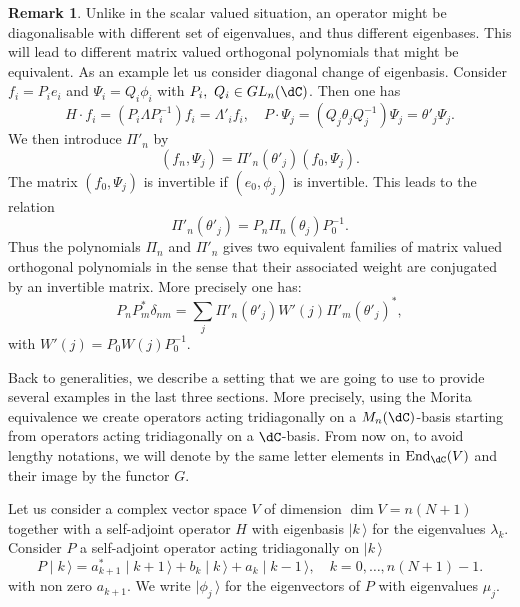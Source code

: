 \documentclass[a4paper,reqno]{amsart}
\DeclareMathOperator\End{ End}
\theoremstyle{definition}
\newtheorem{remark}[theorem]{Remark}
\numberwithin{equation}{section}
\newcommand{\ket}[1]{\mid{#1}\,\rangle}
\begin{document}
\begin{remark}
Unlike in the scalar valued situation, an operator might be diagonalisable with different set of eigenvalues, and thus different eigenbases. This will lead to different matrix valued orthogonal polynomials that might be equivalent. As an example let us consider diagonal change of eigenbasis. Consider $f_i=P_ie_i$ and $\Psi_i=Q_i\phi_i$ with $P_i,\ Q_i\in GL_n(\dC)$. Then one has
\begin{equation}
H\cdot f_i =(P_i\Lambda P_i^{-1}) f_i=\Lambda'_i f_i, \quad P\cdot \Psi_j = (Q_j\theta_jQ_j^{-1})\Psi_j=\theta'_j\Psi_j. 
\end{equation}
We then introduce $\Pi'_n$ by 
\begin{equation}
( f_n, \Psi_j) = \Pi'_n(\theta'_j) ( f_0,\Psi_j) . 
\end{equation}
The matrix $( f_0,\Psi_j) $ is invertible if $( e_0,\phi_j)$ is invertible. This leads to the relation 
\begin{equation}
\Pi'_n(\theta'_j)=P_n\Pi_n(\theta_j)P_0^{-1}. 
\end{equation}
Thus the polynomials $\Pi_n$ and $\Pi'_n$ gives two equivalent families of matrix valued orthogonal polynomials in the sense that their associated weight are conjugated by an invertible matrix. More precisely one has: 
\begin{equation}
P_nP_m^* \delta_{nm} =\sum_j \Pi'_n(\theta'_j)W'(j)\Pi'_m(\theta'_j)^*,
\end{equation}
with $W'(j)=P_0W(j)P_0^{-1}$.  
\end{remark}

Back to generalities, we describe a setting that we are going to use to provide several examples in the last three sections. More precisely, using the Morita equivalence  we create operators acting tridiagonally on a $M_n(\dC)$-basis starting from operators acting tridiagonally on a $\dC$-basis. From now on, to avoid lengthy notations, we will denote by the same letter elements in $\End_\dC(V)$ and their image by the functor $G$.  

Let us consider a complex vector space $V$ of dimension $\dim V=n(N+1)$ together with a self-adjoint operator $H$ with eigenbasis $\ket{k}$ for the eigenvalues $\lambda_k$. Consider $P$ a self-adjoint operator acting tridiagonally on $\ket{k}$
\begin{equation}
P\ket{k}= a_{k+1}^* \ket{k+1}+b_k\ket{k}+a_k \ket{k-1},\quad k=0,\ldots,n(N+1)-1.
\end{equation}
with non zero $a_{k+1}$. We write $\ket{\phi_j}$ for the eigenvectors of $P$ with eigenvalues $\mu_j$. 
\end{document}

